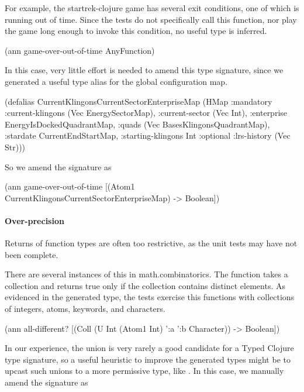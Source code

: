 For example, the startrek-clojure game has several exit
conditions, one of which is running out of time.
Since the tests do not specifically call this function,
nor play the game long enough to invoke this condition,
no useful type is inferred.

\begin{cljlisting}
(ann game-over-out-of-time AnyFunction)
\end{cljlisting}

In this case, very little effort is needed to amend this
type signature, since we generated a useful type alias
for the global configuration map.

\begin{cljlisting}
(defalias CurrentKlingonsCurrentSectorEnterpriseMap
  (HMap :mandatory
    {:current-klingons (Vec EnergySectorMap),
     :current-sector (Vec Int), 
     :enterprise EnergyIsDockedQuadrantMap,
     :quads (Vec BasesKlingonsQuadrantMap), 
     :stardate CurrentEndStartMap,
     :starting-klingons Int}
    :optional {:lrs-history (Vec Str)}))
\end{cljlisting}

So we amend the signature as

\begin{cljlisting}
(ann game-over-out-of-time
  [(Atom1 CurrentKlingonsCurrentSectorEnterpriseMap) 
   -> Boolean])
\end{cljlisting}


\paragraph{Over-precision}
Returns of function types are often too restrictive, as the unit
tests may have not been complete.

There are several instances of this in math.combinatorics.
The  function
takes a collection and returns true only if the collection
contains distinct elements.
As evidenced in the generated type, the tests exercise
this functions with collections of integers, atoms,
keywords, and characters.

\begin{cljlisting}
(ann all-different?
  [(Coll (U Int (Atom1 Int) ':a ':b Character)) 
   -> Boolean])
\end{cljlisting}

In our experience, the union is very rarely a good candidate
for a Typed Clojure type signature, so a useful heuristic to improve
the generated types might be to upcast such unions to a more permissive
type, like . 
In this case, we manually amend the signature as

